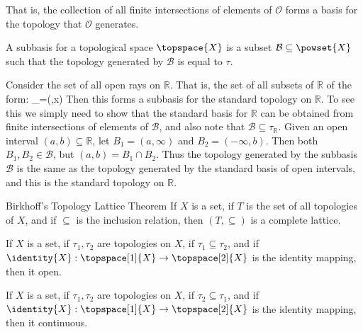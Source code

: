 \documentclass{article}                                                        %
\begin{document}
        That is, the collection of all finite intersections of elements of
        $\mathcal{O}$ forms a basis for the topology that $\mathcal{O}$
        generates.
        \begin{definition}
            A subbasis for a topological space $\topspace{X}$ is a subset
            $\mathcal{B}\subseteq\powset{X}$ such that the topology generated
            by $\mathcal{B}$ is equal to $\tau$.
        \end{definition}
        \begin{example}
            Consider the set of all open rays on $\mathbb{R}$. That is, the set
            of all subsets of $\mathbb{R}$ of the form:
                        {_{\minus}=(\minus\infty,x)}
            Then this forms a subbasis for the standard topology on
            $\mathbb{R}$. To see this we simply need to show that the standard
            basis for $\mathbb{R}$ can be obtained from finite intersections of
            elements of $\mathcal{B}$, and also note that
            $\mathcal{B}\subseteq\tau_{\mathbb{R}}$. Given an open interval
            $(a,b)\subseteq\mathbb{R}$, let $B_{1}=(a,\infty)$ and
            $B_{2}=(\minus\infty,b)$. Then both $B_{1},B_{2}\in\mathcal{B}$,
            but $(a,b)=B_{1}\cap{B}_{2}$. Thus the topology generated by the
            subbasis $\mathcal{B}$ is the same as the topology generated by the
            standard basis of open intervals, and this is the standard
            topology on $\mathbb{R}$.
        \end{example}
        \begin{ltheorem}{Birkhoff's Topology Lattice Theorem}
            If $X$ is a set, if $T$ is the set of all topologies of $X$, and if
            $\subseteq$ is the inclusion relation, then $(T,\subseteq)$ is a
            complete lattice.
        \end{ltheorem}
        \begin{theorem}
            If $X$ is a set, if $\tau_{1},\tau_{2}$ are topologies on $X$,
            if $\tau_{1}\subseteq\tau_{2}$, and if
            $\identity{X}:\topspace[1]{X}\rightarrow\topspace[2]{X}$ is the
            identity mapping, then it open.
        \end{theorem}
        \begin{theorem}
            If $X$ is a set, if $\tau_{1},\tau_{2}$ are topologies on $X$,
            if $\tau_{2}\subseteq\tau_{1}$, and if
            $\identity{X}:\topspace[1]{X}\rightarrow\topspace[2]{X}$ is the
            identity mapping, then it continuous.
        \end{theorem}
\end{document}

